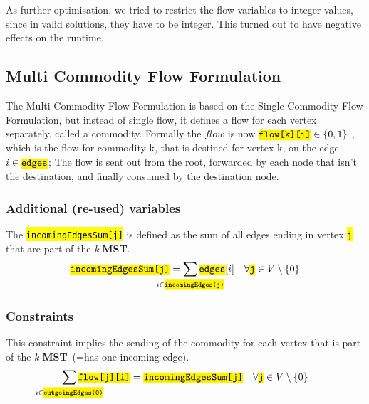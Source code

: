 \documentclass[,%
			paper=a4,%
			DIV14,
			liststotoc,
			bibtotoc,
			draft=false,%
			numbers=noendperiod
			]{scrartcl}
\newcommand{\mst}{\textbf{MST}}
\newcommand{\kmst}{\textit{k}-\mst}
\newcommand{\ilc}[1]{\hl{\texttt{#1}}} %
\newcommand{\commodity}{j}
\newcommand{\edge}{i}
\begin{document}
As further optimisation, we tried to restrict the flow variables to integer values, since in valid solutions, they have to be integer. This turned out to have negative effects on the runtime.

\subsection{Multi Commodity Flow Formulation}
The Multi Commodity Flow Formulation is based on the Single Commodity Flow Formulation, but instead of single flow, it defines a flow for each vertex separately, called a commodity. Formally the $flow$ is now $\ilc{flow[k][i]} \in \left\{0,1\right\}$ , which is the flow for commodity k, that is destined for vertex k, on the edge $i \in \ilc{edges}$; The flow is sent out from the root, forwarded by each node that isn't the destination, and finally consumed by the destination node.

\subsubsection{Additional (re-used) variables}
The \ilc{incomingEdgesSum[\commodity]} is defined as the sum of all edges ending in vertex \ilc{\commodity} that are part of the \kmst.
\begin{equation}\label{eq:mfcInEdges}
	\ilc{incomingEdgesSum[\commodity]} = \sum_{\mathclap{i \in \ilc{incomingEdges(\commodity)}}} \ilc{edges}[i]
\quad \forall \ilc{\commodity} \in V \setminus \{0\}
\end{equation}


\subsubsection{Constraints}

This constraint implies the sending of the commodity for each vertex that is part of the \kmst\ (=has one incoming edge).
\begin{equation}\label{eq:mfcSend}
	\sum_{\mathclap{\edge \in \ilc{outgoingEdges(0)}}} \ilc{flow[\commodity][\edge]} = \ilc{incomingEdgesSum[\commodity]}
\quad \forall \ilc{\commodity} \in V  \setminus \{0\}
\end{equation}
\end{document}
